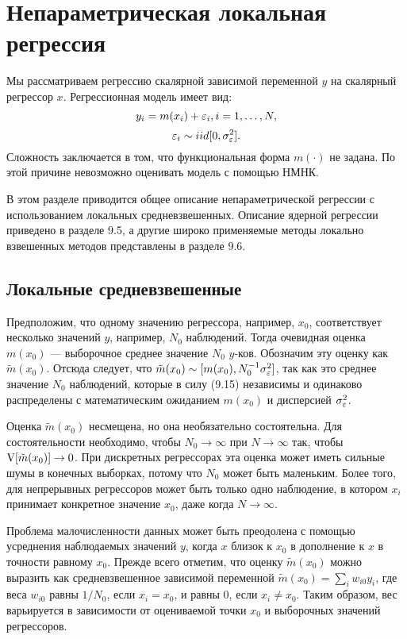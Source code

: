 \section{Непараметрическая локальная регрессия}

Мы рассматриваем регрессию скалярной зависимой переменной $y$ на скалярный регрессор $x$. Регрессионная модель имеет вид:
\begin{equation}
y_i = m(x_i) + \varepsilon_i, i = 1, \dots, N,
\end{equation}
\[
\varepsilon_i \sim iid[0, \sigma_{\varepsilon}^2].
\]
Сложность заключается в том, что функциональная форма $m(\cdot)$ не задана. По этой причине невозможно оценивать модель с помощью НМНК.

В этом разделе приводится общее описание непараметрической регрессии с использованием локальных средневзвешенных. Описание ядерной регрессии приведено в разделе 9.5, а другие широко применяемые методы локально взвешенных методов представлены в разделе 9.6.

\subsection{Локальные средневзвешенные}

Предположим, что одному значению регрессора, например, $x_0$, соответствует несколько значений $y$, например, $N_0$ наблюдений. Тогда очевидная оценка $m(x_0)$ --- выборочное среднее значение $N_0$ $y$-ков. Обозначим эту оценку как $\tilde{m}(x_0)$. Отсюда следует, что $\tilde{m}(x_0) \sim [m(x_0), N_0^{-1}\sigma_{\varepsilon}^2]$, так как это среднее значение $N_0$ наблюдений, которые в силу (9.15) независимы и одинаково распределены с математическим ожиданием $m(x_0)$ и дисперсией $\sigma_{\varepsilon}^2$.

Оценка $\tilde{m}(x_0)$ несмещена, но она необязательно состоятельна. Для состоятельности необходимо, чтобы $N_0 \rightarrow \infty$ при $N \rightarrow \infty$ так, чтобы $\mathrm{V}[\tilde{m}(x_0)] \rightarrow 0$. При дискретных регрессорах эта оценка может иметь сильные шумы в конечных выборках, потому что $N_0$ может быть маленьким. Более того, для непрерывных регрессоров может быть только одно наблюдение, в котором $x_i$ принимает конкретное значение $x_0$, даже когда $N \rightarrow \infty$.

Проблема малочисленности данных может быть преодолена с помощью усреднения наблюдаемых значений $y$, когда $x$ близок к $x_0$ в дополнение к $x$ в точности равному $x_0$. Прежде всего отметим, что оценку $\tilde{m}(x_0)$ можно выразить как средневзвешенное зависимой переменной $\tilde{m}(x_0) = \sum_i w_{i0}y_i$, где веса $w_{i0}$ равны $1/N_0$, если $x_i = x_0$, и равны 0, если $x_i \not= x_0$. Таким образом, вес варьируется в зависимости от оцениваемой точки $x_0$ и выборочных значений регрессоров.

